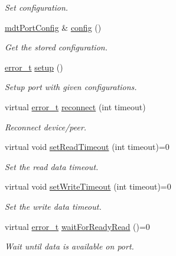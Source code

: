 \begin{DoxyCompactItemize}
\begin{DoxyCompactList}\small\item\em Set configuration. \end{DoxyCompactList}\item 
\hyperlink{classmdt_port_config}{mdtPortConfig} \& \hyperlink{classmdt_abstract_port_a3d105c90696f7c40f29c24fe9b6e4481}{config} ()
\begin{DoxyCompactList}\small\item\em Get the stored configuration. \end{DoxyCompactList}\item 
\hyperlink{classmdt_abstract_port_ad4121bb930c95887e77f8bafa065a85e}{error\_\-t} \hyperlink{classmdt_abstract_port_abc9f1154ac71c4e31ac3e7a3ff4c5182}{setup} ()
\begin{DoxyCompactList}\small\item\em Setup port with given configurations. \end{DoxyCompactList}\item 
virtual \hyperlink{classmdt_abstract_port_ad4121bb930c95887e77f8bafa065a85e}{error\_\-t} \hyperlink{classmdt_abstract_port_aec74b2db1a629d98a95d8f042ea96653}{reconnect} (int timeout)
\begin{DoxyCompactList}\small\item\em Reconnect device/peer. \end{DoxyCompactList}\item 
virtual void \hyperlink{classmdt_abstract_port_a6589b04467e0073d18ba872201bdcd84}{setReadTimeout} (int timeout)=0
\begin{DoxyCompactList}\small\item\em Set the read data timeout. \end{DoxyCompactList}\item 
virtual void \hyperlink{classmdt_abstract_port_a12eb422d52ebb09a650f8497b258c2e7}{setWriteTimeout} (int timeout)=0
\begin{DoxyCompactList}\small\item\em Set the write data timeout. \end{DoxyCompactList}\item 
virtual \hyperlink{classmdt_abstract_port_ad4121bb930c95887e77f8bafa065a85e}{error\_\-t} \hyperlink{classmdt_abstract_port_aeda364cb191da1038a22dd1fc06a1d49}{waitForReadyRead} ()=0
\begin{DoxyCompactList}\small\item\em Wait until data is available on port. \end{DoxyCompactList}\item 

\end{DoxyCompactItemize}
